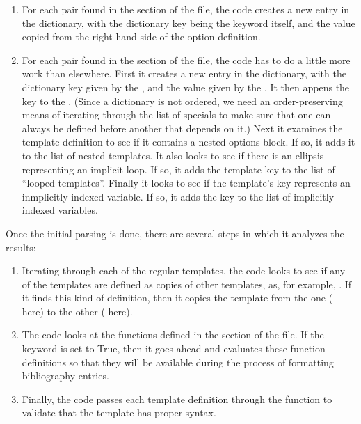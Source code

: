 \documentclass[letterpaper,10pt,english]{sphinxmanual}
\begin{document}
\begin{enumerate}
\item {} 
For each  pair found in the  section of the file, the code creates a new entry in the  dictionary, with the dictionary key being the keyword itself, and the value copied from the right hand side of the option definition.

\item {} 
For each  pair found in the  section of the file, the code has to do a little more work than elsewhere. First it creates a new entry in the  dictionary, with the dictionary key given by the , and the value given by the . It then appens the key to the . (Since a dictionary is not ordered, we need an order-preserving means of iterating through the list of specials to make sure that one can always be defined before another that depends on it.) Next it examines the template definition to see if it contains a nested options block. If so, it adds it to the list of nested templates. It also looks to see if there is an ellipsis representing an implicit loop. If so, it adds the template key to the list of “looped templates”. Finally it looks to see if the template’s key represents an inmplicitly-indexed variable. If so, it adds the key to the list of implicitly indexed variables.

\end{enumerate}

Once the initial parsing is done, there are several steps in which it analyzes the results:
\begin{enumerate}
\item {} 
Iterating through each of the regular templates, the code looks to see if any of the templates are defined as copies of other templates, as, for example, . If it finds this kind of definition, then it copies the template from the one ( here) to the other ( here).

\item {} 
The code looks at the functions defined in the  section of the file. If the  keyword is set to True, then it goes ahead and evaluates these function definitions so that they will be available during the process of formatting bibliography entries.

\item {} 
Finally, the code passes each template definition through the  function to validate that the template has proper syntax.

\end{enumerate}
\end{document}

